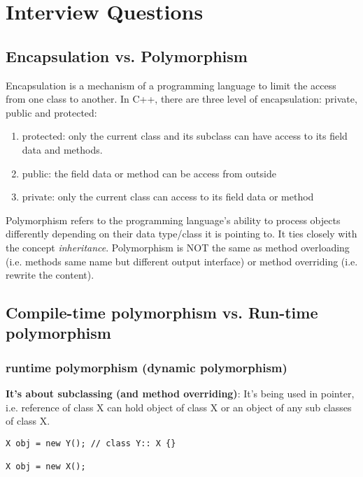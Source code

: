 \chapter{Interview Questions}


\section{Encapsulation vs. Polymorphism}
\label{sec:encapsulation}
\label{sec:polymorphism}

Encapsulation is a mechanism of a programming language to limit the access from
one class to another. In C++, there are three level of encapsulation: private,
public and protected:
\begin{enumerate}
  \item protected: only the current class and its subclass can have access to
  its field data and methods.
  \item public: the field data or method can be access from outside  
  \item private: only the current class can access to its field data or method
\end{enumerate}


Polymorphism refers to the programming language's ability to process objects
differently depending on their data type/class it is pointing to. It ties
closely with the concept {\it inheritance}. Polymorphism is NOT the same as
method overloading (i.e. methods same name but different output interface) or
method overriding (i.e. rewrite the content).


\section{Compile-time polymorphism vs. Run-time polymorphism}


\subsection{runtime polymorphism (dynamic polymorphism)}
\label{sec:polymorphism-runtime}
\label{sec:runtime-polymorphism}

{\bf It's about subclassing (and method overriding)}: It's being used in
pointer, i.e. reference of class X can hold object of class X or an object of
any sub classes of class X.
\begin{verbatim}
X obj = new Y(); // class Y:: X {}

X obj = new X();
\end{verbatim}

